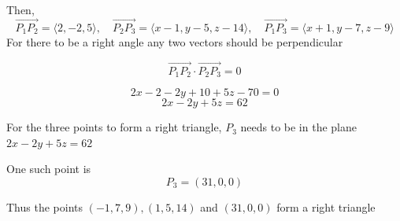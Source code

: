 \documentclass{article}
\begin{document}
Then,
\[
\overrightarrow{P_1P_2} = \langle 2,-2,5 \rangle, \quad \overrightarrow{P_2P_3} = \langle x-1,y-5,z-14 \rangle, 
\quad \overrightarrow{P_1P_3} = \langle x+1,y-7,z-9 \rangle
\]
For there to be a right angle any two vectors should be perpendicular

\[
\overrightarrow{P_1P_2} \cdot \overrightarrow{P_2P_3} = 0
\]

\[
2x-2-2y+10+5z-70 = 0 
\]
\[
2x-2y+5z = 62
\]

For the three points to form a right triangle, \(P_3\) needs to be in the plane \(2x-2y+5z = 62\)

One such point is 
\[P_3 =(31,0,0)\]

Thus the points \((-1,7,9), (1,5,14)\) and \((31,0,0)\) form a right triangle 
\end{document}
